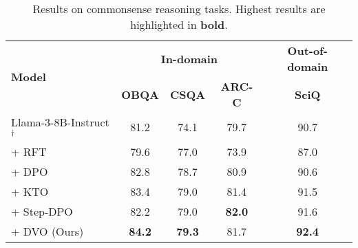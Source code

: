 \begin{table}[t]
\centering\scriptsize
\begin{tabular}{@{}l|ccc|c@{}}
\toprule
\multicolumn{1}{l|}{\multirow{2}{*}{\bf Model}} & \multicolumn{3}{c|}{\bf In-domain}                        & \multicolumn{1}{c}{\bf Out-of-domain} \\
\cmidrule(l){2-5} 
\multicolumn{1}{l|}{}                           & \multicolumn{1}{c}{\bf OBQA} & \multicolumn{1}{c}{\bf CSQA} & \multicolumn{1}{c|}{\bf ARC-C} & \multicolumn{1}{c}{\bf SciQ}\\
\midrule
Llama-3-8B-Instruct$^\dagger$                    & 81.2                     & 74.1                     & 79.7                       & 90.7                              \\
+ RFT                    & 79.6                     & 77.0                     & 73.9                       & 87.0                              \\
+ DPO               & 82.8                     & 78.7                     & 80.9                       & 90.6                              \\
+ KTO             & 83.4                     & 79.0                     & 81.4                       & 91.5                              \\
+ Step-DPO             & 82.2                     & 79.0                     & \bf 82.0                       & 91.6                              \\
+ DVO (Ours)                            & \bf 84.2                     & \bf 79.3                     & 81.7                       & \bf 92.4                              \\
\bottomrule
\end{tabular}
\caption{Results on commonsense reasoning tasks.  Highest results are highlighted in \textbf{bold}. }
\label{tab:main_DVO_general.result}
\vspace{-5pt}
\end{table}
